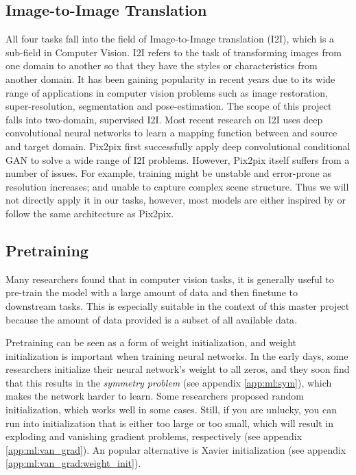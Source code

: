\subsection{Image-to-Image Translation}
All four tasks fall into the field of Image-to-Image translation (I2I), which is a sub-field in Computer Vision. I2I refers to the task of transforming images from one domain to another so that they have the styles or characteristics from another domain. It has been gaining popularity in recent years due to its wide range of applications in computer vision problems such as image restoration, super-resolution, segmentation and pose-estimation. The scope of this project falls into two-domain, supervised I2I\cite{pangImagetoImageTranslationMethods2021}. Most recent research on I2I uses deep convolutional neural networks to learn a mapping function between and source and target domain. Pix2pix\cite{isolaImagetoImageTranslationConditional2018} first successfully apply deep convolutional conditional GAN to solve a wide range of I2I problems. However, Pix2pix itself suffers from a number of issues. For example, training might be unstable and error-prone as resolution increases\cite{wangHighResolutionImageSynthesis2018}; and unable to capture complex scene structure\cite{tangMultiChannelAttentionSelection2019}. Thus we will not directly apply it in our tasks, however, most models are either inspired by or follow the same architecture as Pix2pix.

\subsection{Pretraining}
Many researchers found that in computer vision tasks, it is generally useful to pre-train the model with a large amount of data and then finetune to downstream tasks\cite{baoBEiTBERTPreTraining2021, weiMaskedFeaturePrediction2021, newellHowUsefulSelfSupervised2020}. This is especially suitable in the context of this master project because the amount of data provided is a subset of all available data\cite{newellHowUsefulSelfSupervised2020}.

Pretraining can be seen as a form of weight initialization, and weight initialization is important when training neural networks. In the early days, some researchers initialize their neural network's weight to all zeros, and they soon find that this results in the \textit{symmetry problem} (see appendix \ref{app:ml:sym}), which makes the network harder to learn. Some researchers proposed random initialization, which works well in some cases. Still, if you are unlucky, you can run into initialization that is either too large or too small, which will result in exploding and vanishing gradient problems, respectively (see appendix \ref{app:ml:van_grad}). An popular alternative is Xavier initialization\cite{glorotUnderstandingDifficultyTraining2010} (see appendix \ref{app:ml:van_grad:weight_init}).


